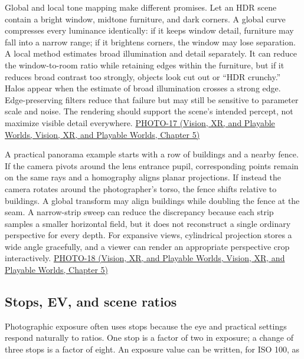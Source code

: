 Global and local tone mapping make different promises. Let an HDR scene contain a bright window, midtone furniture, and dark corners. A global curve compresses every luminance identically: if it keeps window detail, furniture may fall into a narrow range; if it brightens corners, the window may lose separation. A local method estimates broad illumination and detail separately. It can reduce the window-to-room ratio while retaining edges within the furniture, but if it reduces broad contrast too strongly, objects look cut out or ``HDR crunchy.'' Halos appear when the estimate of broad illumination crosses a strong edge. Edge-preserving filters reduce that failure but may still be sensitive to parameter scale and noise. The rendering should support the scene's intended percept, not maximize visible detail everywhere. \href{../07-Vision-XR-and-Playable-Worlds/main.pdf\#nameddest=04-visual-computing-ii-ch036-photo-17---photography-session-17}{PHOTO-17 (Vision, XR, and Playable Worlds, Vision, XR, and Playable Worlds, Chapter 5)}

A practical panorama example starts with a row of buildings and a nearby fence. If the camera pivots around the lens entrance pupil, corresponding points remain on the same rays and a homography aligns planar projections. If instead the camera rotates around the photographer's torso, the fence shifts relative to buildings. A global transform may align buildings while doubling the fence at the seam. A narrow-strip sweep can reduce the discrepancy because each strip samples a smaller horizontal field, but it does not reconstruct a single ordinary perspective for every depth. For expansive views, cylindrical projection stores a wide angle gracefully, and a viewer can render an appropriate perspective crop interactively. \href{../07-Vision-XR-and-Playable-Worlds/main.pdf\#nameddest=04-visual-computing-ii-ch036-photo-18---photography-session-18}{PHOTO-18 (Vision, XR, and Playable Worlds, Vision, XR, and Playable Worlds, Chapter 5)}

\subsection{Stops, EV, and scene ratios}\label{03-visual-computing-i-ch003-stops-ev-and-scene-ratios}

Photographic exposure often uses stops because the eye and practical settings respond naturally to ratios. One stop is a factor of two in exposure; a change of three stops is a factor of eight. An exposure value can be written, for ISO 100, as

